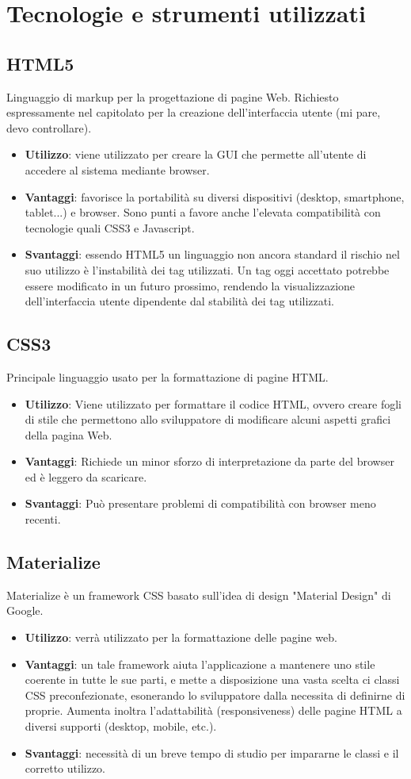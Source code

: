 \documentclass[a4paper,11pt]{article}
\begin{document}
	\section{Tecnologie e strumenti utilizzati}
	\subsection{HTML5}
	Linguaggio di markup per la progettazione di pagine Web. Richiesto espressamente nel capitolato per la creazione dell'interfaccia utente (mi pare, devo controllare).
	\begin{itemize}
		\item\textbf{Utilizzo}: viene utilizzato per creare la GUI che permette all'utente di accedere al sistema mediante browser.
		\item\textbf{Vantaggi}: favorisce la portabilità su diversi dispositivi (desktop, smartphone, tablet...) e browser.
Sono punti a favore anche l'elevata compatibilità con tecnologie quali CSS3 e Javascript.
		\item\textbf{Svantaggi}: essendo HTML5 un linguaggio non ancora standard il rischio nel suo utilizzo è l'instabilità dei tag utilizzati. Un tag oggi accettato potrebbe essere modificato in un futuro prossimo, rendendo la visualizzazione dell'interfaccia utente dipendente dal stabilità dei tag utilizzati. 
	\end{itemize}
	\subsection{CSS3}
	Principale linguaggio usato per la formattazione di pagine HTML.
	\begin{itemize}
		\item\textbf{Utilizzo}: Viene utilizzato per formattare il codice HTML,
ovvero creare fogli di stile che permettono allo sviluppatore di modificare alcuni aspetti grafici della pagina Web.
		\item\textbf{Vantaggi}: Richiede un minor sforzo di interpretazione da parte del browser ed è leggero da scaricare.
		\item\textbf{Svantaggi}: Può presentare problemi di compatibilità con browser meno recenti.
	\end{itemize}
	\subsection{Materialize}
	Materialize è un framework CSS basato sull'idea di design "Material Design" di Google.
	\begin{itemize}
		\item\textbf{Utilizzo}: verrà utilizzato per la formattazione delle pagine web.
		\item\textbf{Vantaggi}: un tale framework aiuta l'applicazione a mantenere uno stile coerente in tutte le sue parti, e mette a disposizione una vasta scelta ci classi CSS preconfezionate, esonerando lo sviluppatore dalla necessita di definirne di proprie. Aumenta inoltra l'adattabilità (responsiveness) delle pagine HTML a diversi supporti (desktop, mobile, etc.).
		\item\textbf{Svantaggi}: necessità di un breve tempo di studio per impararne le classi e il corretto utilizzo.
	\end{itemize}
\end{document}
